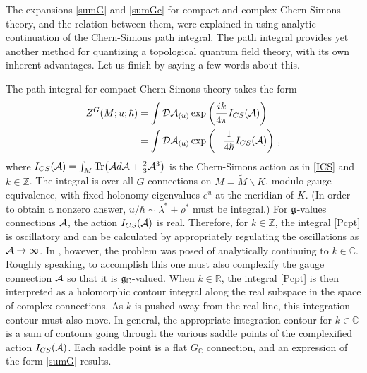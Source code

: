 \documentclass[letterpaper,12pt]{article}
\numberwithin{equation}{section}
\newcommand{\nno}{\nonumber}
\newcommand{\Tr}{{\rm Tr}}
\newcommand{\bs}{\backslash}
\newcommand{\R}{{\mathbb{R}}}
\newcommand{\C}{{\mathbb{C}}}
\newcommand{\Z}{{\mathbb{Z}}}
\newcommand{\fg}{{\frak{g}}}
\newcommand{\CA}{{\cal A}}
\renewcommand{\CD}{{\cal D}}
\renewcommand{\=}{\;=\;}
\begin{document}
The expansions \eqref{sumG} and \eqref{sumGc} for compact and complex Chern-Simons theory, and the relation between them, were explained in \cite{Wit-anal} using analytic continuation of the Chern-Simons path integral. The path integral provides yet another method for quantizing a topological quantum field theory, with its own inherent advantages. Let us finish by saying a few words about this.

The path integral for compact Chern-Simons theory takes the form
%
\begin{align} Z^G(M;u;\hbar)  &= \int \CD\CA_{(u)} \exp\left(\frac{ik}{4\pi}I_{CS}(\CA)\right) \label{Pcpt} \\
&= \int \CD\CA_{(u)} \exp\left(-\frac{1}{4\hbar}I_{CS}(\CA)\right)\,, \nno
\end{align}
%
where $I_{CS}(\CA) = \int_M \Tr\big(\CA d\CA+\frac23\CA^3\big)$ is the Chern-Simons action as in \eqref{ICS} and $k\in\Z$.
The integral is over all $G$-connections on $M=\widetilde{M}\bs K$, modulo gauge equivalence, with fixed holonomy eigenvalues $e^u$ at the meridian of $K$. (In order to obtain a nonzero answer, $u/\hbar\sim \lambda^*+\rho^*$ must be integral.) For $\fg$-values connections $\CA$, the action $I_{CS}(\CA)$ is real. Therefore, for $k\in\Z$, the integral \eqref{Pcpt} is oscillatory and can be calculated by appropriately regulating the oscillations as $\CA\to\infty$. In \cite{Wit-anal}, however, the problem was posed of analytically continuing to $k\in \C$. Roughly speaking, to accomplish this one must also complexify the gauge connection $\CA$ so that it is $\fg_\C$-valued. When $k\in\R$, the integral \eqref{Pcpt} is then interpreted as a holomorphic contour integral along the real subspace in the space of complex connections. As $k$ is pushed away from the real line, this integration contour must also move. In general, the appropriate integration contour for $k\in\C$ is a sum of contours going through the various saddle points of the complexified action $I_{CS}(\CA)$. Each saddle point is a flat $G_\C$ connection, and an expression of the form \eqref{sumG} results.
\end{document}
